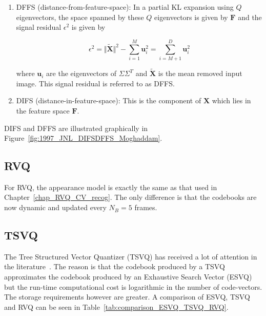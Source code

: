 \begin{enumerate}
\item DFFS (distance-from-feature-space):  In a partial KL expansion using $Q$ eigenvectors, the space spanned by these $Q$ eigenvectors is given by $\mathbf{F}$ and the signal residual $\epsilon^2$ is given by

\begin{equation}
\epsilon^2 = \Vert \tilde{\mathbf{X}} \Vert^2 - \sum\limits_{i=1}^M \mathbf{u}_i^2 = \sum\limits_{i=M+1}^D \mathbf{u}_i^2
\end{equation}

where $\mathbf{u}_i$ are the eigenvectors of $\Sigma\Sigma^T$ and $\tilde{\mathbf{X}}$ is the mean removed input image.  This signal residual is referred to as DFFS.
\item DIFS (distance-in-feature-space):  This is the component of $\mathbf{X}$ which lies in the feature space $\mathbf{F}$.  
\end{enumerate}

DIFS and DFFS are illustrated graphically in Figure~\ref{fig:1997_JNL_DIFSDFFS_Moghaddam}.  

%
%

\subsection{RVQ}
\label{Sec:Chap5_RVQ}
For RVQ, the appearance model is exactly the same as that used in Chapter~\ref{chap_RVQ_CV_recog}.  The only difference is that the codebooks are now dynamic and updated every $N_B=5$ frames. 

\subsection{TSVQ}
\label{Sec:Chap5_TSVQ}
The Tree Structured Vector Quantizer (TSVQ) has received a lot of attention in the literature~\cite{1991_BOOK_VQ_GershoGray}.  The reason is that the codebook produced by a TSVQ approximates the codebook produced by an Exhaustive Search Vector (ESVQ) but the run-time computational cost is logarithmic in the number of code-vectors.  The storage requirements however are greater.  A comparison of ESVQ, TSVQ and RVQ can be seen in Table~\ref{tab:comparison_ESVQ_TSVQ_RVQ}.


